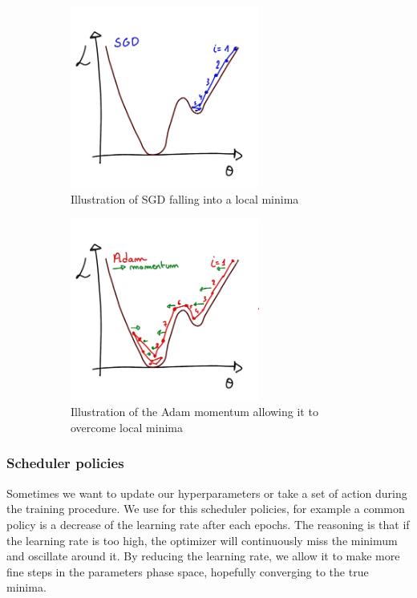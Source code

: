 \documentclass[../main.tex]{subfiles}
\begin{document}
\begin{figure}
  \centering
  \begin{subfigure}[t]{0.48\linewidth}
    \includegraphics[height=6cm]{images/ml/sgd.jpg}
    \caption{Illustration of SGD falling into a local minima}
    \label{fig:ml:sgd}
  \end{subfigure}
  \hfill
  \begin{subfigure}[t]{0.48\linewidth}
    \includegraphics[height=6cm]{images/ml/Adam.jpg}
    \caption{Illustration of the Adam momentum allowing it to overcome local minima}
    \label{fig:ml:adam}
  \end{subfigure}
  \caption{}
\end{figure}

\subsubsection{Scheduler policies}

Sometimes we want to update our hyperparameters or take a set of action during the training procedure. We use for this scheduler policies, for example a common policy is a decrease of the learning rate after each epochs. The reasoning is that if the learning rate is too high, the optimizer will continuously miss the minimum and oscillate around it. By reducing the learning rate, we allow it to make more fine steps in the parameters phase space, hopefully converging to the true minima.
\end{document}
